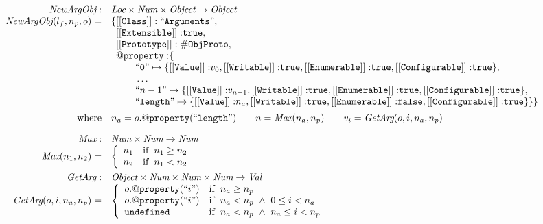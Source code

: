 \[\begin{array}{rl}
\hf{NewArgObj} :& \Loc \times \Num \times \Obj \rightarrow \Obj \\
\hf{NewArgObj}(l_f, n_p, o) =&
{\tt \{[[Class]]: ``Arguments"}, \\%
& \phantom{\{}
{\tt [[Extensible]]:} \true,\\
& \phantom{\{}{\tt [[Prototype]]: \#ObjProto}, \\
& \phantom{\{}{\tt @property:} \{\\
& \phantom{\{\qquad}
{\tt``0"} \mapsto\{{\tt [[Value]]:}v_0,%
{\tt [[Writable]]:} \true,
{\tt [[Enumerable]]:} \true,
{\tt [[Configurable]]:} \true\},\\ %
& \phantom{\{\qquad}
\ldots
\\
& \phantom{\{\qquad}
{``n-1"} \mapsto\{{\tt [[Value]]:}v_{n-1},%
{\tt [[Writable]]:} \true,
{\tt [[Enumerable]]:} \true,
{\tt [[Configurable]]:} \true\},\\ %
& \phantom{\{\qquad}
{\tt``length"}\mapsto  %
\{{\tt [[Value]]:}n_a,%
{\tt [[Writable]]:} \true,
{\tt [[Enumerable]]:} \false,
{\tt [[Configurable]]:} \true\}
\}\}
\\[.5em]
\mbox{where} &
n_a = o.{\tt@property(``length")} %
\rulesep
n = \hf{Max}(n_a, n_p)
\rulesep
v_i = \hf{GetArg}(o, i, n_a, n_p)
\\[1em]

\hf{Max} :& \Num \times \Num \rightarrow \Num\\
\hf{Max}(n_1, n_2) =&
\left\{\begin{array}{ll}
n_1 &\ifc{n_1 \ge n_2}\\
n_2 &\ifc{n_1 < n_2}\\
\end{array}\right.
\\[1em]

\hf{GetArg} :& \Obj \times \Num \times \Num \times \Num \rightarrow \Val\\
\hf{GetArg}(o, i, n_a, n_p) =&
\left\{\begin{array}{ll}
o.{\tt@property(``}i{\tt")} %
 &\ifc{n_a \ge n_p}\\
o.{\tt@property(``}i{\tt")} %
 &\ifc{n_a < n_p ~\wedge~ 0 \le i < n_a}\\
\undef &\ifc{n_a < n_p ~\wedge~ n_a \le i < n_p}\\
\end{array}\right.
\\[2em]
\end{array}
\]


